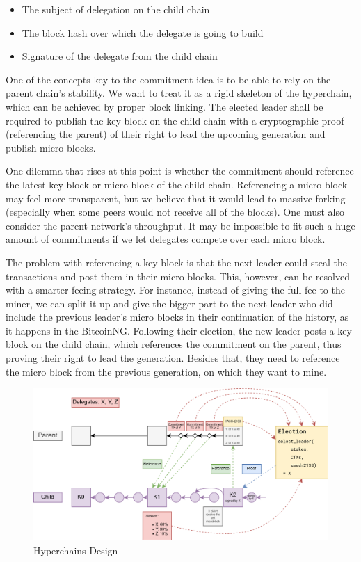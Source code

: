 \begin{itemize}
\item The subject of delegation on the child chain
\item The block hash over which the delegate is going to build
\item Signature of the delegate from the child chain
\end{itemize}

One of the concepts key to the commitment idea is to be able to rely on the
parent chain's stability. We want to treat it as a rigid skeleton of the
hyperchain, which can be achieved by proper block linking. The elected leader
shall be required to publish the key block on the child chain with a
cryptographic proof (referencing the parent) of their right to lead the upcoming
generation and publish micro blocks.

One dilemma that rises at this point is whether the commitment should reference
the latest key block or micro block of the child chain. Referencing a micro
block may feel more transparent, but we believe that it would lead to massive
forking (especially when some peers would not receive all of the blocks). One
must also consider the parent network's throughput. It may be impossible to fit
such a huge amount of commitments if we let delegates compete over each micro
block.

The problem with referencing a key block is that the next leader could steal the
transactions and post them in their micro blocks. This, however, can be resolved
with a smarter feeing strategy. For instance, instead of giving the full fee to
the miner, we can split it up and give the bigger part to the next leader who
did include the previous leader's micro blocks in their continuation of the
history, as it happens in the BitcoinNG\cite{incentive_bcng}. Following their
election, the new leader posts a key block on the child chain, which references
the commitment on the parent, thus proving their right to lead the generation.
Besides that, they need to reference the micro block from the previous
generation, on which they want to mine.

\begin{figure}[h]
	\caption{Hyperchains Design}
	\centering
	\includegraphics[scale=0.4]{hyperchains_design}
\end{figure}
